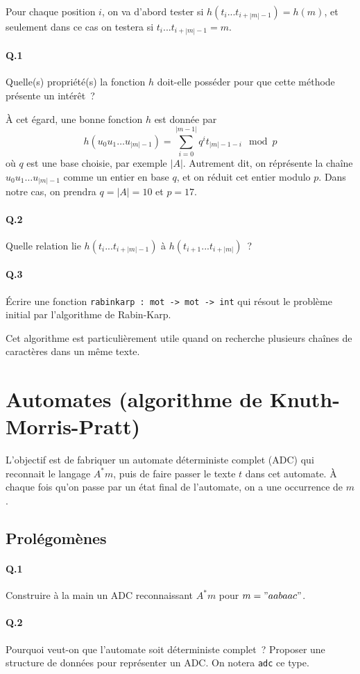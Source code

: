 \documentclass[10pt,a4paper]{article}
\begin{document}
Pour chaque position $i$, on va d'abord tester si $h(t_i...t_{i+|m|-1}) = h(m)$, et
seulement dans ce cas on testera si $t_i...t_{i+|m|-1} = m$.
\paragraph{Q.1} Quelle(s) propriété(s) la fonction $h$ doit-elle posséder pour 
que cette méthode présente un intérêt~?

À cet égard, une bonne fonction $h$ est donnée par
\[h(u_0u_1\dots u_{|m|-1}) = \sum_{i=0}^{|m-1|} q^i t_{|m|-1-i} \mod p\]
où $q$ est une base choisie, par exemple $|A|$. Autrement dit, on réprésente la
chaîne $u_0u_1\dots u_{|m|-1}$ comme un entier en base $q$, et on réduit cet 
entier modulo $p$. Dans notre cas, on prendra $q=|A|=10$ et $p=17$.
\paragraph{Q.2} Quelle relation lie $h(t_i...t_{i+|m|-1})$ 
à $h(t_{i+1}...t_{i+|m|})$~?
\paragraph{Q.3} Écrire une fonction \texttt{rabinkarp : mot -> mot -> int} qui 
résout le problème initial par l'algorithme de Rabin-Karp.

Cet algorithme est particulièrement utile quand on recherche plusieurs chaînes 
de caractères dans un même texte.
\section{Automates (algorithme de Knuth-Morris-Pratt)}
L'objectif est de fabriquer un automate déterministe complet (ADC) qui reconnait
le langage $A^* m$, puis de faire passer le texte $t$ dans cet automate. À 
chaque fois qu'on passe par un état final de l'automate, on a une occurrence de 
$m$.
\subsection{Prolégomènes}
\paragraph{Q.1} Construire à la main un ADC reconnaissant $A^* m$ pour $m="aabaac"$.
\paragraph{Q.2} Pourquoi veut-on que l'automate soit déterministe complet~? 
Proposer une structure de données pour représenter un ADC. On notera 
\texttt{adc} ce type.
\end{document}
